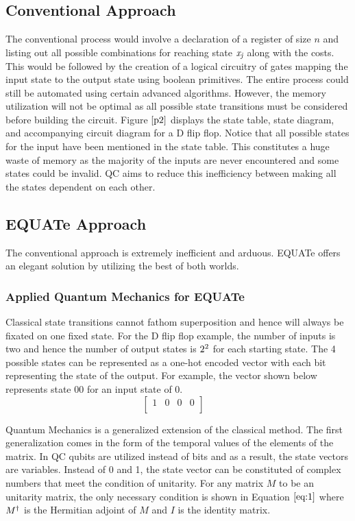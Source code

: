 \documentclass[conference]{IEEEtran}
\begin{document}
\subsection{Conventional Approach}
The conventional process would involve a declaration of a register of size $\textit{n}$ and listing out all possible combinations for reaching state $\textit{x\textsubscript{j}}$ along with the costs. This would be followed by the creation of a logical circuitry of gates mapping the input state to the output state using boolean primitives. The entire process could still be automated using certain advanced algorithms. However, the memory utilization will not be optimal as all possible state transitions must be considered before building the circuit. Figure $\ref{p2}$ displays the state table, state diagram, and accompanying circuit diagram for a D flip flop. Notice that all possible states for the input have been mentioned in the state table. This constitutes a huge waste of memory as the majority of the inputs are never encountered and some states could be invalid. QC aims to reduce this inefficiency between making all the states dependent on each other.

\subsection{EQUATe Approach}

The conventional approach is extremely inefficient and arduous. EQUATe offers an elegant solution by utilizing the best of both worlds. 

\subsubsection{Applied Quantum Mechanics for EQUATe}
Classical state transitions cannot fathom superposition and hence will always be fixated on one fixed state. For the D flip flop example, the number of inputs is two and hence the number of output states is $2\textsuperscript{2}$ for each starting state. The 4 possible states can be represented as a one-hot encoded vector with each bit representing the state of the output. For example, the vector shown below represents state 00 for an input state of 0.
$$
\begin{bmatrix} 
1&0&0&0\\
\end{bmatrix}
\quad
$$

Quantum Mechanics is a generalized extension of the classical method. The first generalization comes in the form of the temporal values of the elements of the matrix. In QC qubits are utilized instead of bits and as a result, the state vectors are variables. Instead of 0 and 1, the state vector can be constituted of complex numbers that meet the condition of unitarity. For any matrix $\textit{M}$ to be an unitarity matrix, the only necessary condition is shown in Equation $\ref{eq:1}$ where $M\textsuperscript{$\dagger$}$ is the Hermitian adjoint of $\textit{M}$ and $\textit{I}$ is the identity matrix. 
\end{document}
